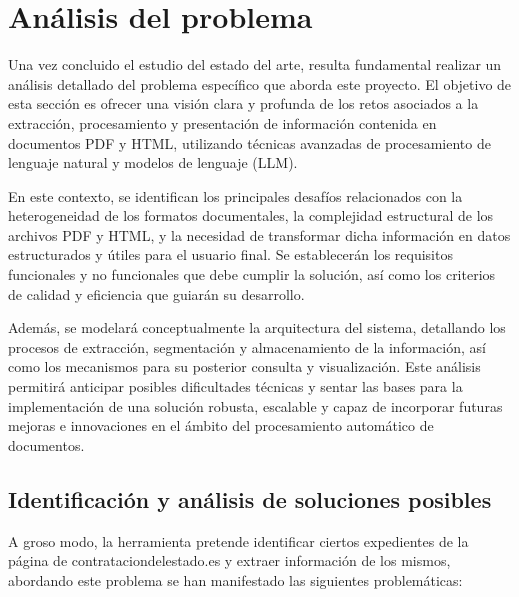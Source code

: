 \documentclass{article}
\begin{document}
\section{Análisis del problema}
Una vez concluido el estudio del estado del arte, resulta fundamental realizar un análisis detallado del problema específico que aborda este proyecto. El objetivo de esta sección es ofrecer una visión clara y profunda de los retos asociados a la extracción, procesamiento y presentación de información contenida en documentos PDF y HTML, utilizando técnicas avanzadas de procesamiento de lenguaje natural y modelos de lenguaje (LLM).

En este contexto, se identifican los principales desafíos relacionados con la heterogeneidad de los formatos documentales, la complejidad estructural de los archivos PDF y HTML, y la necesidad de transformar dicha información en datos estructurados y útiles para el usuario final. Se establecerán los requisitos funcionales y no funcionales que debe cumplir la solución, así como los criterios de calidad y eficiencia que guiarán su desarrollo.

Además, se modelará conceptualmente la arquitectura del sistema, detallando los procesos de extracción, segmentación y almacenamiento de la información, así como los mecanismos para su posterior consulta y visualización. Este análisis permitirá anticipar posibles dificultades técnicas y sentar las bases para la implementación de una solución robusta, escalable y capaz de incorporar futuras mejoras e innovaciones en el ámbito del procesamiento automático de documentos.

\subsection{Identificación y análisis de soluciones posibles}
A groso modo, la herramienta pretende identificar ciertos expedientes de la página de contrataciondelestado.es y extraer información de los mismos, abordando este problema se han manifestado las siguientes problemáticas: 
\end{document}
